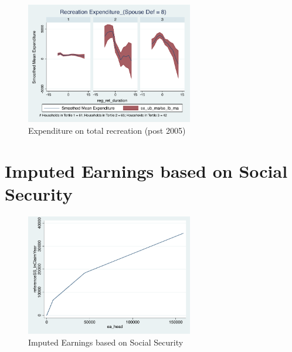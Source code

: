 \documentclass[11pt,onecolumn]{article}
\numberwithin{figure}{section}
\begin{document}
\begin{figure}[h]
	\caption{Expenditure on total recreation (post 2005)}
	\centering
	\includegraphics[width=0.65\textwidth]{../ConsumptionPostRetirement_by_SpouseDef_Cats/Smoothed/8/spouse_def_total_recreation_2005_real.pdf}
\end{figure}

\clearpage

\section{Imputed Earnings based on Social Security}
\begin{figure}[h]
	\caption{Imputed Earnings based on Social Security}
	\centering
	\includegraphics[width=0.65\textwidth]{../ImputedEarnings/year_ss_claim_2005.pdf}
\end{figure}
\end{document}
